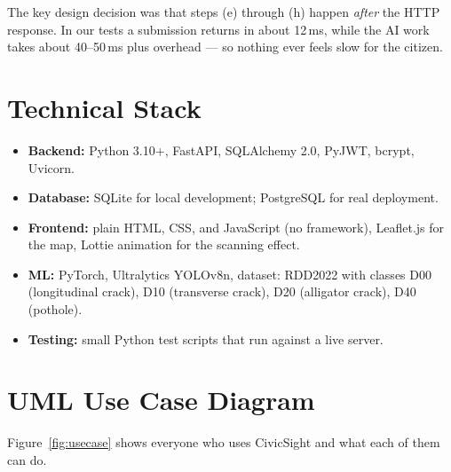 \documentclass{tietreport}
\begin{document}
The key design decision was that steps (e) through (h) happen \emph{after} the HTTP response. In our tests a submission returns in about 12\,ms, while the AI work takes about 40--50\,ms plus overhead --- so nothing ever feels slow for the citizen.

\clearpage
\section{Technical Stack}

\begin{itemize}
  \item \textbf{Backend:} Python 3.10+, FastAPI, SQLAlchemy 2.0, PyJWT, bcrypt, Uvicorn.
  \item \textbf{Database:} SQLite for local development; PostgreSQL for real deployment.
  \item \textbf{Frontend:} plain HTML, CSS, and JavaScript (no framework), Leaflet.js for the map, Lottie animation for the scanning effect.
  \item \textbf{ML:} PyTorch, Ultralytics YOLOv8n, dataset: RDD2022 with classes D00 (longitudinal crack), D10 (transverse crack), D20 (alligator crack), D40 (pothole).
  \item \textbf{Testing:} small Python test scripts that run against a live server.
\end{itemize}


\clearpage
\section{UML Use Case Diagram}

Figure~\ref{fig:usecase} shows everyone who uses CivicSight and what each of them can do.
\end{document}

